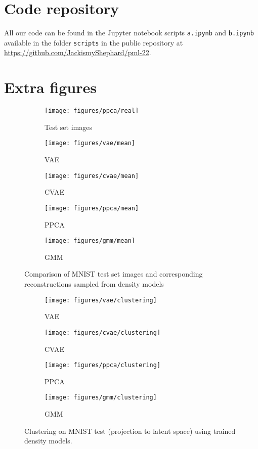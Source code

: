 
\section{Code repository}
All our code can be found in the Jupyter notebook scripts \texttt{a.ipynb} and \texttt{b.ipynb} available in the folder \texttt{scripts} in the public repository at
\url{https://github.com/JackismyShephard/pml-22}.

\section{Extra figures}
\begin{figure}[!h]
	\begin{subfigure}[t]{1\textwidth}
		\centering
		\texttt{[image: figures/ppca/real]}
		\caption{Test set images}
	\end{subfigure}
	\begin{subfigure}[t]{1\textwidth}
		\centering
		\texttt{[image: figures/vae/mean]}
		\caption{VAE}
	\end{subfigure}
	\begin{subfigure}[t]{1\textwidth}
		\centering
		\texttt{[image: figures/cvae/mean]}
		\caption{CVAE}
	\end{subfigure}
	\begin{subfigure}[t]{1\textwidth}
		\centering
		\texttt{[image: figures/ppca/mean]}
		\caption{PPCA}
	\end{subfigure}
	\begin{subfigure}[t]{1\textwidth}
		\centering
		\texttt{[image: figures/gmm/mean]}
		\caption{GMM}
	\end{subfigure}
	\caption{Comparison of MNIST test set images and corresponding reconstructions sampled from density models}
\end{figure}

\begin{figure}[!h]
	\begin{subfigure}[t]{0.49\textwidth}
		\centering
		\texttt{[image: figures/vae/clustering]}
		\caption{VAE}
	\end{subfigure}
	\begin{subfigure}[t]{0.49\textwidth}
		\centering
		\texttt{[image: figures/cvae/clustering]}
		\caption{CVAE}
	\end{subfigure}
	\begin{subfigure}[t]{0.49\textwidth}
		\centering
		\texttt{[image: figures/ppca/clustering]}
		\caption{PPCA}
	\end{subfigure}
	\begin{subfigure}[t]{0.49\textwidth}
		\centering
		\texttt{[image: figures/gmm/clustering]}
		\caption{GMM}
	\end{subfigure}
	\caption{Clustering on MNIST test (projection to latent space) using trained density models.}	
\end{figure}

